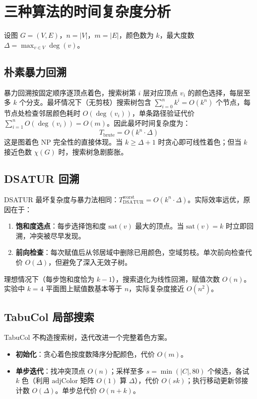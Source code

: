 \documentclass[UTF8,a4paper,12pt]{ctexart}
\begin{document}
\section{三种算法的时间复杂度分析}

设图 $G=(V,E)$，$n=|V|$，$m=|E|$，颜色数为 $k$，最大度数 $\Delta=\max_{v\in V}\deg(v)$。

\subsection{朴素暴力回溯}

暴力回溯按固定顺序逐顶点着色，搜索树第 $i$ 层对应顶点 $v_i$ 的颜色选择，每层至多 $k$ 个分支。最坏情况下（无剪枝）搜索树包含 $\sum_{i=0}^{n} k^i = O(k^n)$ 个节点，每节点处检查邻居颜色耗时 $O(\deg(v_i))$，单条路径验证代价 $\sum_{i=1}^{n}O(\deg(v_i))=O(m)$。因此最坏时间复杂度为：
\[
T_{\mathrm{brute}} = O(k^n \cdot \Delta)
\]
这是图着色 NP 完全性的直接体现。当 $k\ge\Delta+1$ 时贪心即可线性着色；但当 $k$ 接近色数 $\chi(G)$ 时，搜索树急剧膨胀。

\subsection{DSATUR 回溯}

DSATUR 最坏复杂度与暴力法相同：$T_{\mathrm{DSATUR}}^{\mathrm{worst}}=O(k^n\cdot\Delta)$。实际效率远优，原因在于：
\begin{enumerate}
    \item \textbf{饱和度选点}：每步选择饱和度 $\mathrm{sat}(v)$ 最大的顶点。当 $\mathrm{sat}(v)=k$ 时立即回溯，冲突被尽早发现。
    \item \textbf{前向检查}：每次赋值后从邻居域中删除已用颜色，空域剪枝。单次前向检查代价 $O(\Delta)$，但避免了深入无效子树。
\end{enumerate}

理想情况下（每步饱和度恰为 $k-1$），搜索退化为线性回溯，赋值次数 $O(n)$。实验中 $k=4$ 平面图上赋值数基本等于 $n$，实际复杂度接近 $O(n^2)$。

\subsection{TabuCol 局部搜索}

TabuCol 不构造搜索树，迭代改进一个完整着色方案。
\begin{itemize}
    \item \textbf{初始化}：贪心着色按度数降序分配颜色，代价 $O(m)$。
    \item \textbf{单步迭代}：找冲突顶点 $O(n)$；采样至多 $s=\min(|C|,80)$ 个候选，各试 $k$ 色（利用 $\mathrm{adjColor}$ 矩阵 $O(1)$ 算 $\Delta$），代价 $O(sk)$；执行移动更新邻接计数 $O(\Delta)$。单步总代价 $O(n+k)$。
\end{itemize}
\end{document}
